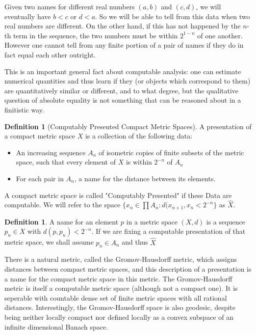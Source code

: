 \documentclass[10pt,a4paper]{article}
\theoremstyle{definition}
\newtheorem{dfn}[thm]{Definition}
\begin{document}
Given two names for different real numbers $(a ,b)$ and $(c,d)$, we will eventually have $b < c$ or $d < a$. So we will be able to tell from this data when two real numbers are different. On the other hand, if this has not happened by the $n$-th term in the sequence, the two numbers must be within $2^{1-n}$ of one another. However one cannot tell from any finite portion of a pair of names if they do in fact equal each other outright.

This is an important general fact about computable analysis: one can estimate numerical quantities and thus learn if they (or objects which correspond to them) are quantitatively similar or different, and to what degree, but the qualitative question of absolute equality is not something that can be reasoned about in a finitistic way.

\begin{dfn}[Computably Presented Compact Metric Spaces]
    A presentation of a compact metric space $X$ is a collection of the following data:
    \begin{itemize}
        \item An increasing sequence $A_n$ of isometric copies of finite subsets of the metric space, such that every element of $X$ is within $2^{-n}$ of $A_n$
        \item For each pair in $A_n$, a name for the distance between its elements.
        
    \end{itemize}
    A compact metric space is called "Computably Presented" if these Data are computable. We will refer to the space $\{x_n\in\prod A_n: d(x_{n+1}, x_{n} < 2^{-n}\}$ as $\hat{X}$.
\end{dfn}
\label{dfn:cpmetricspace}
\begin{dfn}
    A name for an element $p$ in a metric space $(X,d)$ is a sequence $p_n \in X$ with $d(p,p_n) < 2^{-n}$. If we are fixing a computable presentation of that metric space, we shall assume $p_n\in A_n$ and thus $\hat{X}$
\end{dfn}
\label{dfn:nameinmet}

There is a natural metric, called the Gromov-Hausdorff metric, which assigns distances between compact metric spaces, and this description of a presentation is a name for the compact metric space in this metric. The Gromov-Hausdorff metric is itself a computable metric space (although not a compact one). It is seperable with countable dense set of finite metric spaces with all rational distances. Interestingly, the Gromov-Hausdorff space is also geodesic, despite being neither locally compact nor defined locally as a convex subspace of an infinite dimensional Banach space.
\end{document}
